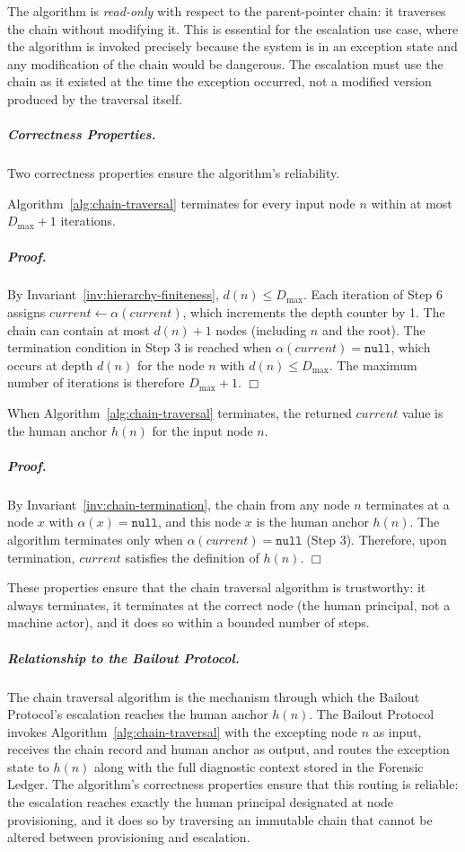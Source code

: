 The algorithm is \textit{read-only} with respect to the parent-pointer chain: it traverses the chain without modifying it. This is essential for the escalation use case, where the algorithm is invoked precisely because the system is in an exception state and any modification of the chain would be dangerous. The escalation must use the chain as it existed at the time the exception occurred, not a modified version produced by the traversal itself.

\subparagraph{Correctness Properties.} Two correctness properties ensure the algorithm's reliability.

\begin{property}[Termination]\label{prop:chain-termination}
Algorithm~\ref{alg:chain-traversal} terminates for every input node $n$ within at most $D_{\max} + 1$ iterations.
\end{property}

\subparagraph{Proof.} By Invariant~\ref{inv:hierarchy-finiteness}, $d(n) \leq D_{\max}$. Each iteration of Step 6 assigns $current \leftarrow \alpha(current)$, which increments the depth counter by 1. The chain can contain at most $d(n) + 1$ nodes (including $n$ and the root). The termination condition in Step 3 is reached when $\alpha(current) = \texttt{null}$, which occurs at depth $d(n)$ for the node $n$ with $d(n) \leq D_{\max}$. The maximum number of iterations is therefore $D_{\max} + 1$. $\Box$

\begin{property}\label{prop:correct-anchor}
When Algorithm~\ref{alg:chain-traversal} terminates, the returned $current$ value is the human anchor $h(n)$ for the input node $n$.
\end{property}

\subparagraph{Proof.} By Invariant~\ref{inv:chain-termination}, the chain from any node $n$ terminates at a node $x$ with $\alpha(x) = \texttt{null}$, and this node $x$ is the human anchor $h(n)$. The algorithm terminates only when $\alpha(current) = \texttt{null}$ (Step 3). Therefore, upon termination, $current$ satisfies the definition of $h(n)$. $\Box$

These properties ensure that the chain traversal algorithm is trustworthy: it always terminates, it terminates at the correct node (the human principal, not a machine actor), and it does so within a bounded number of steps.

\subparagraph{Relationship to the Bailout Protocol.} The chain traversal algorithm is the mechanism through which the Bailout Protocol's escalation reaches the human anchor $h(n)$. The Bailout Protocol invokes Algorithm~\ref{alg:chain-traversal} with the excepting node $n$ as input, receives the chain record and human anchor as output, and routes the exception state to $h(n)$ along with the full diagnostic context stored in the Forensic Ledger. The algorithm's correctness properties ensure that this routing is reliable: the escalation reaches exactly the human principal designated at node provisioning, and it does so by traversing an immutable chain that cannot be altered between provisioning and escalation.

